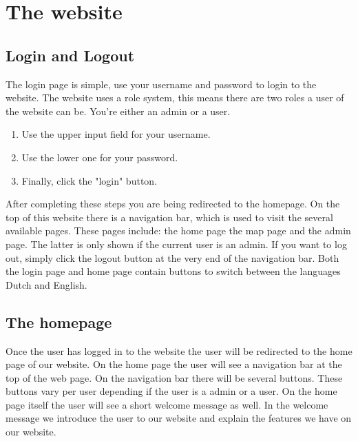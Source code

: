 \documentclass[a4paper]{article}
\begin{document}
\newpage
\section{The website}
\subsection{Login and Logout}
The login page is simple, use your username and password to login to the website. The website uses a role system, this means there are two roles a user of the website can be. You're either an admin or a user. 

\begin{enumerate}[]
	\item Use the upper input field for your username.
	\item Use the lower one for your password.
	\item Finally, click the "login" button.
\end{enumerate}
\noindent
After completing these steps you are being redirected to the homepage.
\newline
\newline
On the top of this website there is a navigation bar, which is used to visit the several available pages. These pages include: the home page the map page and the admin page. The latter is only shown if the current user is an admin.
\newline
\newline
If you want to log out, simply click the logout button at the very end of the navigation bar.
\newline
\newline
Both the login page and home page contain buttons to switch between the languages Dutch and English.

\subsection{The homepage}
Once the user has logged in to the website the user will be redirected to the home page of our website. On the home page the user will see a navigation bar at the top of the web page. On the navigation bar there will be several buttons. These buttons vary per user depending if the user is a admin or a user. 
\newline
\newline
On the home page itself the user will see a short welcome message as well. In the welcome message we introduce the user to our website and explain the features we have on our website. 
\pagebreak
\end{document}
